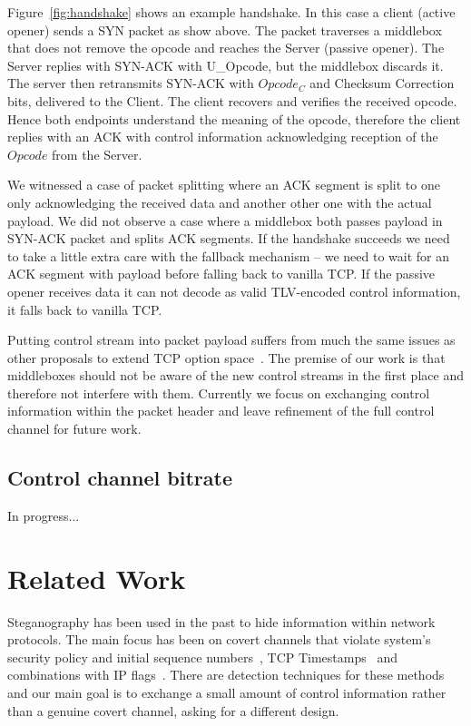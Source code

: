 \documentclass{sig-alternate-10pt}
\begin{document}
Figure~\ref{fig:handshake} shows an example handshake. In this case a client (active opener) sends a SYN packet as show above. The packet traverses a middlebox that does not remove the opcode and reaches the Server (passive opener). The Server replies with SYN-ACK with U\_Opcode, but the middlebox discards it. The server then retransmits SYN-ACK with $Opcode_C$ and Checksum Correction bits, delivered to the Client. The client recovers and verifies the received opcode. Hence both endpoints understand the meaning of the opcode, therefore the client replies with an ACK with control information acknowledging reception of the $Opcode$ from the Server.

We witnessed a case of packet splitting where an ACK segment is split to one only acknowledging the received data and another other one with the actual payload. We did not observe a case where a middlebox both passes payload in SYN-ACK packet and splits ACK segments. If the handshake succeeds we need to take a little extra care with the fallback mechanism -- we need to wait for an ACK segment with payload before falling back to vanilla TCP. If the passive opener receives data it can not decode as valid TLV-encoded control information, it falls back to vanilla TCP.

Putting control stream into packet payload suffers from much the same issues as other proposals to extend TCP option space~\cite{Ramaiah:2012wa}. The premise of our work is that middleboxes should not be aware of the new control streams in the first place and therefore not interfere with them. Currently we focus on exchanging control information within the packet header and leave refinement of the full control channel for future work.

\subsection{Control channel bitrate}

In progress...

\section{Related Work}
\label{sec:related}

Steganography has been used in the past to hide information within network protocols. The main focus has been on covert channels that violate system's security policy and initial sequence numbers~\cite{Rowland:1997vq}, TCP Timestamps~\cite{Giffin:2002wh} and combinations with IP flags~\cite{Murdoch:2005fz}. There are detection techniques for these methods and our main goal is to exchange a small amount of control information rather than a genuine covert channel, asking for a different design.
\end{document}
